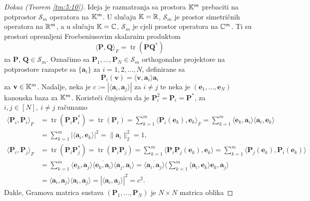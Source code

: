 \documentclass[a4paper,twoside,12pt]{memoir} %
\newcommand{\vect}[1]{\mathbf{#1}}
\renewcommand{\vec}{\vect}
\newcommand{\norm}[1]{\|{#1}\|}
\DeclareMathOperator{\tr}{tr}
\begin{document}
\begin{proof}[Dokaz (Teorem \ref{tm:5:10})]
    Ideja je razmatranja sa prostora $\mathbb{K}^m$ prebaciti na potprostor $\mathcal{S}_m$ operatora na $\mathbb{K}^m$. U slu\v{c}aju $\mathbb{K} = \mathbb{R}$, $\mathcal{S}_m$ je prostor simetri\v{c}nih operatora na $\mathbb{R}^m$, a u slu\v{c}aju $\mathbb{K} = \mathbb{C}$, $\mathcal{S}_m$ je cjeli prostor operatora na $\mathbb{C}^m$. Ti su prostori opremljeni Froebeniusovim skalarnim produktom
    \begin{equation}
        \langle \vec P, \vec Q \rangle_F = \tr(\vec{PQ}^*) 
    \end{equation}
    za $\vec P$, $\vec Q \in \mathcal{S}_m$.
    Ozna\v{c}imo sa $\vec P_1, \dots, \vec P_N \in \mathcal{S}_m$ orthogonalne projektore na potprostore razapete sa $\{\vec a_i\}$ za $i=1,2,\dots,N$, definirane sa
    \begin{equation*}
        \vec P_i(\vec v) = \langle \vec v, \vec a_i \rangle \vec a_i
    \end{equation*}
    za $\vec v \in \K^m$. Nadalje, neka je $c:=|\langle \vec a_i, \vec a_j \rangle|$ za $i \neq j$ te neka je $(\vec e_1, \dots, \vec e_N)$ kanonska baza za $\mathbb{K}^m$. Koriste\v{c}i \v{c}injenicu da je $\vec P_i^2 = \vec P_i = \vec P^*$, za $i,j \in [N],\ i \neq j$ ra\v{c}unamo
    \begin{align*}
        \langle \vec P_i, \vec P_i \rangle_F &= \tr(\vec P_i \vec P_i^*) = \tr(\vec P_i) = \sum_{k=1}^{m} \langle \vec P_i(\vec e_k), \vec e_k \rangle_F = \sum_{k=1}^{m} \langle \vec e_k, \vec a_i \rangle \langle \vec a_i, \vec e_k \rangle \\
    &= \sum_{k=1}^m |\langle \vec a_i, \vec e_k \rangle|^2 = \norm{\vec a_i}_2^2 = 1, \\
        \langle \vec P_i, \vec P_j \rangle_F &= \tr(\vec P_i \vec P_j^*) = \tr(\vec P_i \vec P_j) = \sum_{k=1}^m \langle \vec P_i \vec P_j (\vec e_k), \vec e_k \rangle = \sum_{k=1}^m \langle \vec P_j(\vec e_k), \vec P_i(\vec e_k) \rangle \\
        &= \sum_{k=1}^m \langle \vec e_k, \vec a_j \rangle \overline{\langle \vec e_k, \vec a_i \rangle}\langle \vec a_j, \vec a_i \rangle = \overline{\langle \vec a_i, \vec a_j \rangle} \big \langle \sum_{k=1}^m \langle \vec a_i, \vec e_k \rangle \vec e_k, \vec a_j  \big \rangle\\
        &= \overline{\langle \vec a_i, \vec a_j \rangle} \langle \vec a_i, \vec a_j \rangle = |\langle \vec a_i, \vec a_j \rangle|^2 = c^2.
    \end{align*}
    Dakle, Gramova matrica sustava $(\vec P_1, \dots, \vec P_N)$ je $N \times N$ matrica oblika

\end{proof}
\end{document}
